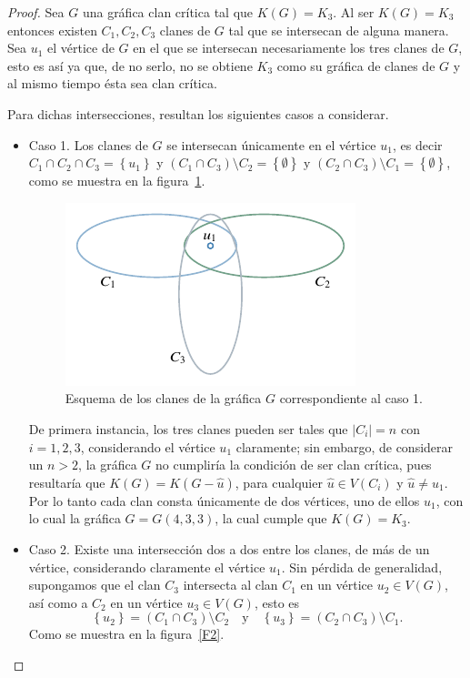\documentclass[12pt]{book}
\theoremstyle{definition}
\begin{document}
\begin{proof}
Sea $G$ una gráfica clan crítica tal que $K(G)=K_3$. Al ser $K(G)=K_3$ entonces existen $C_1,C_2,C_3$ clanes de $G$ tal que se intersecan de alguna manera.
Sea $u_1$ el vértice de $G$ en el que se intersecan necesariamente los tres clanes de $G$, esto es así ya que, de no serlo, no se obtiene $K_3$ como su gráfica de clanes de $G$ y al mismo tiempo ésta sea clan crítica.

Para dichas intersecciones, resultan los siguientes casos a considerar.
\begin{itemize}
\item Caso 1. 
Los clanes de $G$ se intersecan únicamente en el vértice $u_1$, es decir $C_1\cap C_2\cap C_3=\left\{u_1\right\}$ y $(C_1\cap C_3)\setminus C_2=\left\{\emptyset\right\}  \text{ y }(C_2\cap C_3)\setminus C_1=\left\{\emptyset\right\}$, como se muestra en la figura~\ref{F1}.

\begin{figure}[!htbp]
	\centering
	\includegraphics[scale=1.2]{Fig1.pdf}
	\caption{Esquema de los clanes de la gráfica $G$ correspondiente al caso 1.\label{F1}}
\end{figure}

De primera instancia, los tres clanes pueden ser tales que $|C_i|=n$ con $i=1,2,3$, considerando el vértice $u_1$ claramente; sin embargo, de considerar un $n>2$, la gráfica $G$ no cumpliría la condición de ser clan crítica, pues resultaría que $K(G)=K(G-\hat{u})$, para cualquier $\hat{u}\in V(C_i)$ y $\hat{u}\neq u_1$. Por lo tanto cada clan consta únicamente de dos vértices, uno de ellos $u_1$, con lo cual la gráfica $G=G(4,3,3)$, la cual cumple que $K(G)=K_3$.

\item Caso 2.
Existe una intersección dos a dos entre los clanes, de más de un vértice, considerando claramente el vértice $u_1$. Sin pérdida de generalidad, supongamos que el clan $C_3$ intersecta al clan $C_1$ en un vértice $u_2\in V(G)$, así como a $C_2$ en un vértice $u_3\in V(G)$, esto es 
\begin{equation*}
\left\{u_2\right\}=(C_1\cap C_3)\setminus C_2 \quad \text{y} \quad \left\{u_3\right\}=(C_2\cap C_3)\setminus C_1.
\end{equation*}
Como se muestra en la figura~\ref{F2}.


\end{itemize}
\end{proof}
\end{document}
